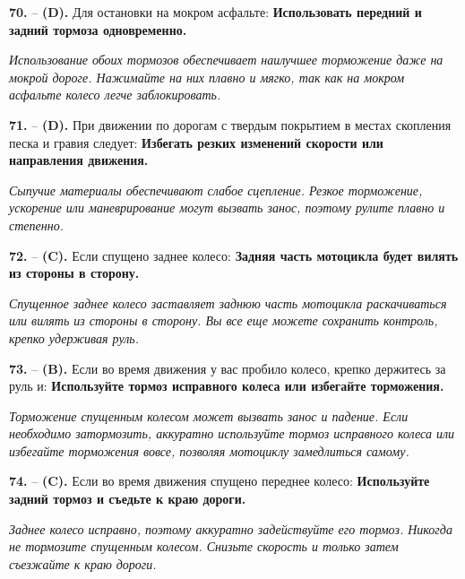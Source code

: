 \begin{minipage}{\linewidth}
\noindent\textbf{70.}  -- \textbf {(D).} Для остановки на мокром асфальте:  \textbf {Использовать передний и задний тормоза одновременно.} \par \textit {Использование обоих тормозов обеспечивает наилучшее торможение даже на мокрой дороге. Нажимайте на них плавно и мягко, так как на мокром асфальте колесо легче заблокировать.} \\
\end{minipage}

\begin{minipage}{\linewidth}
\noindent\textbf{71.}  -- \textbf {(D).} При движении по дорогам с твердым покрытием в местах скопления песка и гравия следует:  \textbf {Избегать резких изменений скорости или направления движения.} \par \textit {Сыпучие материалы обеспечивают слабое сцепление. Резкое торможение, ускорение или маневрирование могут вызвать занос, поэтому рулите плавно и степенно.} \\
\end{minipage}

\begin{minipage}{\linewidth}
\noindent\textbf{72.}  -- \textbf {(C).} Если спущено заднее колесо:  \textbf {Задняя часть мотоцикла будет вилять из стороны в сторону.} \par \textit {Спущенное заднее колесо заставляет заднюю часть мотоцикла раскачиваться или вилять из стороны в сторону. Вы все еще можете сохранить контроль, крепко удерживая руль.} \\
\end{minipage}

\begin{minipage}{\linewidth}
\noindent\textbf{73.}  -- \textbf {(B).} Если во время движения у вас пробило колесо, крепко держитесь за руль и:  \textbf {Используйте тормоз исправного колеса или избегайте торможения.} \par \textit {Торможение спущенным колесом может вызвать занос и падение. Если необходимо затормозить, аккуратно используйте тормоз исправного колеса или избегайте торможения вовсе, позволяя мотоциклу замедлиться самому.} \\
\end{minipage}

\begin{minipage}{\linewidth}
\noindent\textbf{74.}  -- \textbf {(C).} Если во время движения спущено переднее колесо:  \textbf {Используйте задний тормоз и съедьте к краю дороги.} \par \textit {Заднее колесо исправно, поэтому аккуратно задействуйте его тормоз. Никогда не тормозите спущенным колесом. Снизьте скорость и только затем съезжайте к краю дороги.} \\
\end{minipage}

